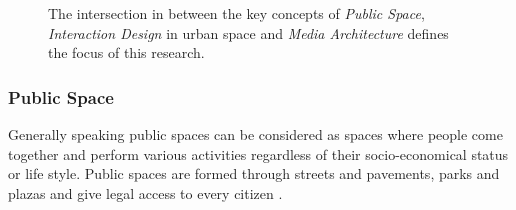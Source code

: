 
\begin{figure} [h!]
\centering
\pagestyle{empty}

\def\firstcircle{(0,0) circle (2cm)}
\def\secondcircle{(1.6,-2.6) circle (2cm)}
\def\thirdcircle{(-1.6,-2.6) circle (2cm)}


\caption[Graphic illustrating key concepts of this PhD]{The intersection in between the key concepts of \textit{Public Space}, \textit{Interaction Design} in urban space and \textit{Media Architecture} defines the focus of this research. }
\label{keyconcept}
\end{figure}


\subsubsection* {Public Space}

Generally speaking public spaces can be considered as spaces where people come together and perform various activities regardless of their socio-economical status or life style. Public spaces are formed through streets and pavements, parks and plazas and give legal access to every citizen \cite{Lofland_1973}. 

